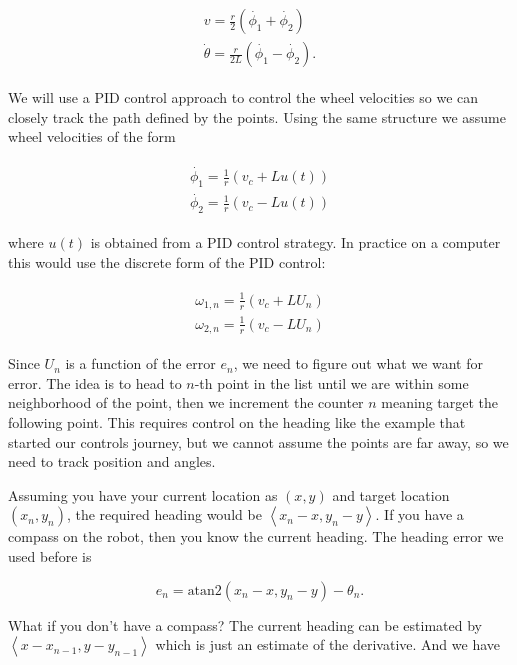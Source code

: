 \[\begin{aligned}
\begin{array}{l}
v = \frac{r}{2} (\dot{\phi_1}+\dot{\phi_2}) \\[3mm]
\dot{\theta} = \frac{r}{2L} (\dot{\phi_1}-\dot{\phi_2}) .
\end{array}
\end{aligned}\]

We will use a PID control approach to control the wheel velocities so we
can closely track the path defined by the points. Using the same
structure we assume wheel velocities of the form

\[\begin{aligned}
\begin{array}{l}
\dot{\phi_1} = \frac{1}{r} (v_c+Lu(t))\\[3mm]
\dot{\phi_2} = \frac{1}{r} (v_c-Lu(t))
\end{array}
\end{aligned}\]

where \(u(t)\) is obtained from a PID control strategy. In practice on a
computer this would use the discrete form of the PID control:

\[\begin{aligned}
\begin{array}{l}
\omega_{1,n} = \frac{1}{r} (v_c+LU_n)\\[3mm]
\omega_{2,n} = \frac{1}{r} (v_c-LU_n)
\end{array}
\end{aligned}\]

Since \(U_n\) is a function of the error \(e_n\), we need to figure out
what we want for error. The idea is to head to \(n\)-th point in the
list until we are within some neighborhood of the point, then we
increment the counter \(n\) meaning target the following point. This
requires control on the heading like the example that started our
controls journey, but we cannot assume the points are far away, so we
need to track position and angles.

Assuming you have your current location as \((x,y)\) and target location
\((x_n,y_n)\), the required heading would be
\(\left\langle x_n -x, y_n - y \right\rangle\). If you have a compass on
the robot, then you know the current heading. The heading error we used
before is

\[e_n =  \mbox{atan2}( x_n - x , y_n - y) - \theta_n .\]

What if you don't have a compass? The current heading can be estimated
by \(\left\langle x-x_{n-1} , y - y_{n-1}\right\rangle\) which is just
an estimate of the derivative. And we have

